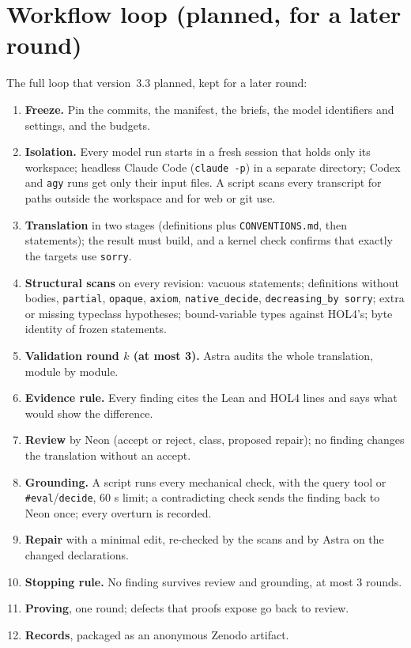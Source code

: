 \documentclass[11pt,a4paper]{article}
\newcommand{\code}[1]{\texttt{#1}}
\begin{document}
\section{Workflow loop (planned, for a later round)}\label{sec:workflow}
The full loop that version~3.3 planned, kept for a later round:
\begin{enumerate}
\item \textbf{Freeze.} Pin the commits, the manifest, the briefs, the model identifiers and settings, and the budgets.
\item \textbf{Isolation.} Every model run starts in a fresh session that holds only its workspace; headless Claude Code (\code{claude -p}) in a separate directory; Codex and \code{agy} runs get only their input files. A script scans every transcript for paths outside the workspace and for web or git use.
\item \textbf{Translation} in two stages (definitions plus \code{CONVENTIONS.md}, then statements); the result must build, and a kernel check confirms that exactly the targets use \code{sorry}.
\item \textbf{Structural scans} on every revision: vacuous statements; definitions without bodies, \code{partial}, \code{opaque}, \code{axiom}, \code{native\_decide}, \code{decreasing\_by sorry}; extra or missing typeclass hypotheses; bound-variable types against HOL4's; byte identity of frozen statements.
\item \textbf{Validation round $k$ (at most 3).} Astra audits the whole translation, module by module.
\item \textbf{Evidence rule.} Every finding cites the Lean and HOL4 lines and says what would show the difference.
\item \textbf{Review} by Neon (accept or reject, class, proposed repair); no finding changes the translation without an accept.
\item \textbf{Grounding.} A script runs every mechanical check, with the query tool or \code{\#eval}/\code{decide}, 60 s limit; a contradicting check sends the finding back to Neon once; every overturn is recorded.
\item \textbf{Repair} with a minimal edit, re-checked by the scans and by Astra on the changed declarations.
\item \textbf{Stopping rule.} No finding survives review and grounding, at most 3 rounds.
\item \textbf{Proving}, one round; defects that proofs expose go back to review.
\item \textbf{Records}, packaged as an anonymous Zenodo artifact.
\end{enumerate}
\end{document}

